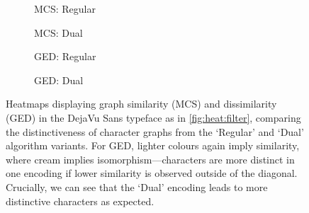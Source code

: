 \documentclass{mpaper}
\begin{document}
\begin{figure}
	\centering
	\begin{subfigure}[b]{0.225\linewidth}
		
		\caption{MCS: Regular\label{fig:heat:dual:mcs-r}}
	\end{subfigure}
	\begin{subfigure}[b]{0.225\linewidth}
		
		\caption{MCS: Dual\label{fig:heat:dual:mcs-d}}
	\end{subfigure}
	\begin{subfigure}[b]{0.225\linewidth}
		
		\caption{GED: Regular\label{fig:heat:dual:ged-r}}
	\end{subfigure}
	\begin{subfigure}[b]{0.225\linewidth}
		
		\caption{GED: Dual\label{fig:heat:dual:ged-d}}
	\end{subfigure}
	
	\vspace{0.5em}
	\caption{
		Heatmaps displaying graph similarity (MCS) and dissimilarity (GED) in the DejaVu Sans typeface as in \cref{fig:heat:filter}, comparing the distinctiveness of character graphs from the `Regular' and `Dual' algorithm variants.
		For GED, lighter colours again imply similarity, where cream implies isomorphism---characters are more distinct in one encoding if lower similarity is observed outside of the diagonal.
		Crucially, we can see that the `Dual' encoding leads to more distinctive characters as expected.
		\label{fig:heat:dual}
	}
\end{figure}
\end{document}
